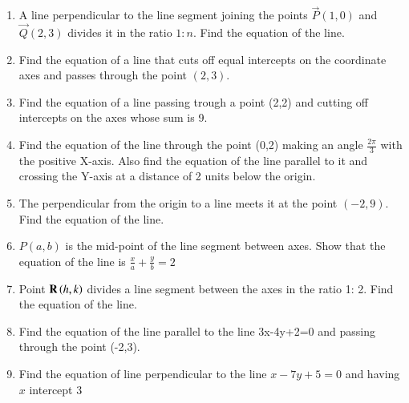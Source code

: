 \begin{enumerate}[label=\thesection.\arabic*,ref=\thesection.\theenumi]
	\solution 
\label{chapters/11/10/2/10}

\item 
A line perpendicular to the line segment joining the points $\vec{P}(1,0)$ and $\vec{Q}(2,3)$ divides it in the ratio $1:n$. Find the equation of the line.
	\\
	\solution 
\label{chapters/11/10/2/11}

\item Find the equation of a line that cuts off equal intercepts on the coordinate axes and passes through the point $(2,3)$.  
	\\
\solution 
\label{chapters/11/10/2/12}

\item 
Find the equation of a line passing trough a point (2,2) and cutting off intercepts on the axes whose sum is 9.
	\\
	\solution 
\label{chapters/11/10/2/13}

\item 
	Find the equation of the line through the point (0,2) making an angle $\frac{2\pi}{3}$ with the positive X-axis. Also find the equation of the line parallel to it and crossing the Y-axis at a distance of 2 units below the origin.
	\\
	\solution
\label{chapters/11/10/2/14}

\item 
	The perpendicular from the origin to a line meets it at the point $(-2,9)$. Find the equation of the line.
\label{chapters/11/10/2/15}
	\\
	\solution

\item 
$P(a,b)$ is the mid-point of the line segment between axes. Show that the equation of the line is $\frac{x}{a}+\frac{y}{b}=2$
\label{chapters/11/10/2/18}
\\
\solution

\item Point $\mathbf{R}\left(h, k\right)$ divides a line segment between the axes in the ratio 1: 2. Find the equation of the line.
\label{chapters/11/10/2/19}
	\\
	\solution 

\item Find the equation of the line  parallel to the line 3x-4y+2=0 and passing through the point (-2,3).
\label{chapters/11/10/3/7}
\\
\solution 

\item Find the equation of line perpendicular to the line $x-7y+5=0$ and having $x$ intercept $3$\\

\end{enumerate}
